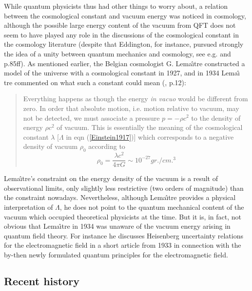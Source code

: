 \documentclass[12pt]{article}
\def\ss{\subsection}
\begin{document}
While quantum physicists thus had other things to worry about, a
relation between the cosmological constant and vacuum energy was
noticed in cosmology, although the possible large energy
content of the vacuum from QFT does not seem to have played any
role in the discussions of the cosmological constant in the
cosmology literature
(despite that Eddington, for instance, pursued strongly the idea of
a unity between quantum mechanics and cosmology, see e.g.
\cite{kilmister94} and \cite{north65} p.85ff). As mentioned
earlier, the Belgian cosmologist G. Lema\^ \i tre constructed
a model of the universe with a cosmological constant in
1927, and in 1934 Lema\^ \i
tre commented on what such a constant could mean 
(\cite{lemaitre33}, p.12):

\begin{quote}
Everything happens as though the energy {\em in vacuo}
would be different from zero. In order that absolute motion,
i.e. motion relative to vacuum, may not be detected, we must associate
a pressure $p = - \rho c^2$ to the density of energy $\rho c^2$
of vacuum. This is essentially the 
meaning of the cosmological
constant $\lambda$ [$\Lambda$ in eqn (\ref{Einstein1917})] 
which corresponds to a negative density of
vacuum $\rho_0$ according to
$$\rho_0 = \frac{{\lambda} c^2}{4 \pi G} \sim 10^{-27} gr./cm.^3$$
\end{quote}
Lema\^ \i tre's constraint on the energy density of the vacuum is
a result of observational limits, only slightly less restrictive (two
orders of magnitude) than the constraint nowadays. 
Nevertheless, although Lema\^ \i tre
provides a physical interpretation of $\Lambda$, he does not point
to the quantum mechanical content of the
vacuum which occupied theoretical physicists at the time. 
But it is, in fact, not obvious
that Lema\^ \i tre in 1934 was unaware of the vacuum energy
arising in quantum field theory. For instance he discusses
Heisenberg uncertainty relations for the electromagnetic field in
a short article \cite{lemaitre33b} from 1933 in connection with
the by-then newly formulated quantum principles for the
electromagnetic field.


\ss{Recent history}
\end{document}

